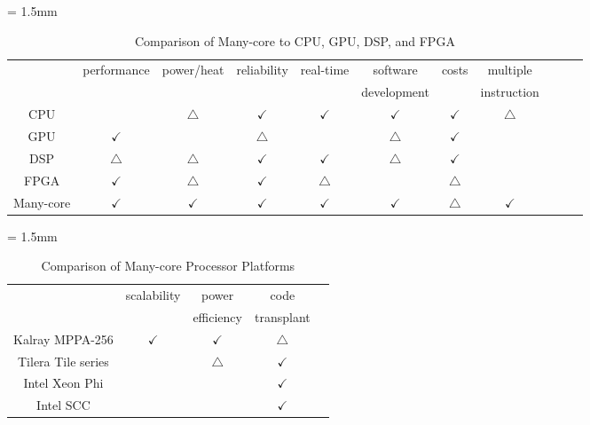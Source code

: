 \documentclass{sig-alternate-05-2015}
\begin{document}
\begin{table}[t]
  \caption{\label{tb:comparison_platforms}
    Comparison of Many-core to CPU, GPU, DSP, and FPGA}
  \centering
  \scriptsize	                    %
  \tabcolsep = 1.5mm              %
  \begin{tabular}{c|cccccccccc}
    \hline
    & \multirow{2}{*}{performance} & \multirow{2}{*}{power/heat} & \multirow{2}{*}{reliability} & \multirow{2}{*}{real-time} & software & \multirow{2}{*}{costs} & multiple\\
    &&&&& development && instruction \\
    \hline
    \hline
    CPU & & \(\bigtriangleup\) & \(\checkmark\) & \(\checkmark\) & \(\checkmark\) & \(\checkmark\) & \(\bigtriangleup\) \\
    GPU & \(\checkmark\) &  & \(\bigtriangleup\) &  & \(\bigtriangleup\) & \(\checkmark\)\\
    DSP & \(\bigtriangleup\) & \(\bigtriangleup\) & \(\checkmark\) & \(\checkmark\) & \(\bigtriangleup\) & \(\checkmark\) & \\
    FPGA & \(\checkmark\) & \(\bigtriangleup\) & \(\checkmark\) & \(\bigtriangleup\) &  & \(\bigtriangleup\) & \\
    Many-core & \(\checkmark\) & \(\checkmark\) & \(\checkmark\) & \(\checkmark\) & \(\checkmark\) & \(\bigtriangleup\) & \(\checkmark\) \\
    \hline
  \end{tabular}
  \vspace{-5mm}
\end{table}

\begin{table}[t]
  \caption{\label{tb:comparison_manycore}
    Comparison of Many-core Processor Platforms}
  \centering
  \scriptsize	                    %
  \tabcolsep = 1.5mm              %
  \begin{tabular}{c|cccc}
    \hline
    & \multirow{2}{*}{scalability} & power  & code & \\
    & & efficiency & transplant & \\
    \hline
    \hline
    Kalray MPPA-256 \cite{de2014time} & \(\checkmark\) & \(\checkmark\) & \(\bigtriangleup\) & \\
    Tilera Tile series \cite{bell2008tile64} &  & \(\bigtriangleup\) & \(\checkmark\) & \\
    Intel Xeon Phi \cite{chrysos2014intel} \cite{chrysos2012intel} &  &  & \(\checkmark\) & \\
    Intel SCC \cite{baron2010single} &  &  & \(\checkmark\) & \\
    \hline
  \end{tabular}
  \vspace{-5mm}
\end{table}
\end{document}
